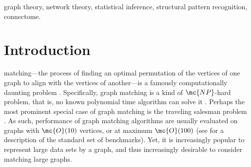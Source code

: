 \documentclass[10pt,journal,cspaper,compsoc]{IEEEtran}
\begin{document}
{\begin{abstract}
\end{abstract}

\begin{keywords}
graph theory, network theory, statistical inference, structural pattern recognition, connectome.
\end{keywords}}


\maketitle
\IEEEdisplaynotcompsoctitleabstractindextext
\IEEEpeerreviewmaketitle



\section{Introduction}

 matching---the process of finding an optimal permutation of the vertices of one graph to align with the vertices of another---is a famously computationally daunting problem \cite{Conte2004}. Specifically, graph matching is a kind of $\mc{NP}$-hard problem, that is, no known polynomial time algorithm can solve it \cite{Papadimitriou1998}.  Perhaps the most prominent special case of graph matching is the traveling salesman problem \cite{Burkard2009}. As such, performance of graph matching algorithms are usually evaluated on graphs with $\mc{O}(10)$ vertices, or at maximum $\mc{O}(100)$ (see \cite{Burkard1997} for a description of the standard set of benchmarks).  Yet, it is increasingly popular to represent large data sets by a graph, and thus increasingly desirable to consider matching large graphs.  
\end{document}
